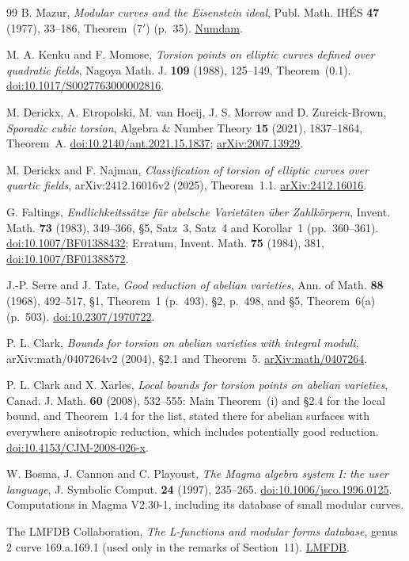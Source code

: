 \documentclass[11pt]{article}
\begin{document}
\begin{thebibliography}{99}
B. Mazur,
\emph{Modular curves and the Eisenstein ideal},
Publ. Math. IH\'ES \textbf{47} (1977), 33--186, Theorem~(7$'$) (p.~35).
\href{https://www.numdam.org/item/PMIHES_1977__47__33_0/}{Numdam}.

M. A. Kenku and F. Momose,
\emph{Torsion points on elliptic curves defined over quadratic fields},
Nagoya Math. J. \textbf{109} (1988), 125--149, Theorem~(0.1).
\href{https://doi.org/10.1017/S0027763000002816}{doi:10.1017/S0027763000002816}.

M. Derickx, A. Etropolski, M. van Hoeij, J. S. Morrow and
D. Zureick-Brown,
\emph{Sporadic cubic torsion},
Algebra \& Number Theory \textbf{15} (2021), 1837--1864, Theorem~A.
\href{https://doi.org/10.2140/ant.2021.15.1837}{doi:10.2140/ant.2021.15.1837};
\href{https://arxiv.org/abs/2007.13929}{arXiv:2007.13929}.

M. Derickx and F. Najman,
\emph{Classification of torsion of elliptic curves over quartic fields},
arXiv:2412.16016v2 (2025), Theorem~1.1.
\href{https://arxiv.org/pdf/2412.16016}{arXiv:2412.16016}.

G. Faltings,
\emph{Endlichkeitss\"atze f\"ur abelsche Variet\"aten \"uber
Zahlk\"orpern},
Invent. Math. \textbf{73} (1983), 349--366, \S5, Satz~3, Satz~4 and
Korollar~1 (pp.~360--361).
\href{https://doi.org/10.1007/BF01388432}{doi:10.1007/BF01388432};
Erratum, Invent. Math. \textbf{75} (1984), 381,
\href{https://doi.org/10.1007/BF01388572}{doi:10.1007/BF01388572}.

J.-P. Serre and J. Tate,
\emph{Good reduction of abelian varieties},
Ann. of Math. \textbf{88} (1968), 492--517, \S1, Theorem~1 (p.~493), \S2, p.~498, and \S5,
Theorem~6(a) (p.~503).
\href{https://doi.org/10.2307/1970722}{doi:10.2307/1970722}.

P. L. Clark,
\emph{Bounds for torsion on abelian varieties with integral moduli},
arXiv:math/0407264v2 (2004), \S2.1 and Theorem~5.
\href{https://arxiv.org/pdf/math/0407264}{arXiv:math/0407264}.

P. L. Clark and X. Xarles,
\emph{Local bounds for torsion points on abelian varieties},
Canad. J. Math. \textbf{60} (2008), 532--555: Main Theorem~(i) and
\S2.4 for the local bound, and Theorem~1.4 for the list, stated there
for abelian surfaces with everywhere anisotropic reduction, which
includes potentially good reduction.
\href{https://doi.org/10.4153/CJM-2008-026-x}{doi:10.4153/CJM-2008-026-x}.

W. Bosma, J. Cannon and C. Playoust,
\emph{The Magma algebra system I: the user language},
J. Symbolic Comput. \textbf{24} (1997), 235--265.
\href{https://doi.org/10.1006/jsco.1996.0125}{doi:10.1006/jsco.1996.0125}.
Computations in Magma V2.30-1, including its database of small modular
curves.

The LMFDB Collaboration,
\emph{The L-functions and modular forms database}, genus 2 curve
169.a.169.1 (used only in the remarks of Section~11).
\href{https://www.lmfdb.org/Genus2Curve/Q/169/a/169/1}{LMFDB}.
\end{thebibliography}
\end{document}
